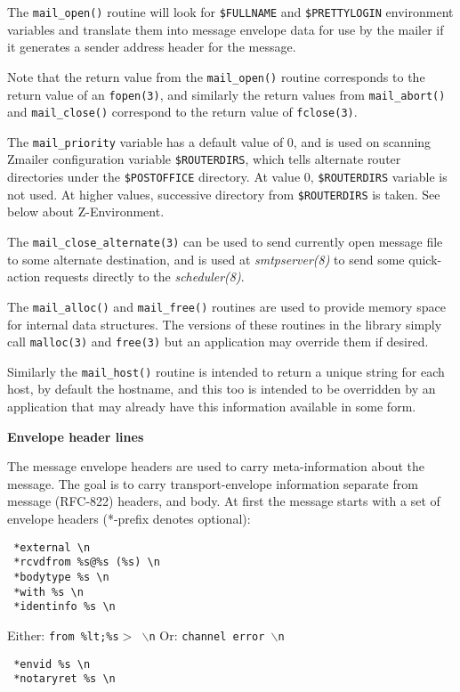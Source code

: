 The {\tt mail\_open()} routine will look for {\tt \$FULLNAME} 
and {\tt \$PRETTYLOGIN} environment variables and translate 
them into message envelope data for use by the mailer if it generates 
a sender address header for the message.

Note that the return value from the {\tt mail\_open()} routine
corresponds to the return value of an {\tt fopen(3)}, and similarly
the return values from {\tt mail\_abort()} and {\tt mail\_close()} 
correspond to the return value of {\tt fclose(3)}.

The {\tt mail\_priority} variable has a default value of 0, 
and is used on scanning Zmailer configuration variable 
{\tt \$ROUTERDIRS}, which tells alternate router directories 
under the {\tt \$POSTOFFICE} directory. At value 0, 
{\tt \$ROUTERDIRS} variable is not used. At higher values, 
successive directory from {\tt \$ROUTERDIRS} is taken. 
See below about Z-Environment.

The {\tt mail\_close\_alternate(3)} can be used to send currently
open message file to some alternate destination, and is
used at {\em smtpserver(8)\/} to send some quick-action requests
directly to the {\em scheduler(8)\/}.

The {\tt mail\_alloc()} and {\tt mail\_free()} routines are used 
to provide memory space for internal data structures. The versions
of these routines in the library simply call {\tt malloc(3)} and
{\tt free(3)} but an application may override them if desired.

Similarly the {\tt mail\_host()} routine is intended to return a
unique string for each host, by default the hostname, and
this too is intended to be overridden by an application
that may already have this information available in some form.

{\bf Envelope header lines}

The message envelope headers are used to carry meta-information
about the message.  The goal is to carry transport-envelope 
information separate from message (RFC-822) headers, and body.
At first the message starts with a set of envelope headers 
(*-prefix denotes optional):

\begin{verbatim}
 *external \n
 *rcvdfrom %s@%s (%s) \n
 *bodytype %s \n
 *with %s \n
 *identinfo %s \n
\end{verbatim}

Either: {\tt from \%lt;\%s{\(>\)} \(\backslash\)n} Or: {\tt channel error \(\backslash\)n}
\begin{verbatim}
 *envid %s \n
 *notaryret %s \n
\end{verbatim}



